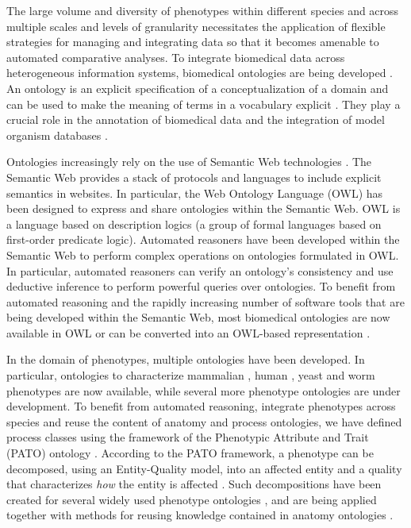\documentclass{bioinfo}
\renewcommand{\cite}{\citep}
\begin{document}
The large volume and diversity of phenotypes within different species
and across multiple scales and levels of granularity necessitates the
application of flexible strategies for managing and integrating data
so that it becomes amenable to automated comparative analyses. To
integrate biomedical data across heterogeneous information systems,
biomedical ontologies are being developed \cite{Smith2007}. An
ontology is an explicit specification of a conceptualization of a
domain and can be used to make the meaning of terms in a vocabulary
explicit \cite{Gruber1995, Guarino1998}. They play a crucial role in
the annotation of biomedical data and the integration of model
organism databases \cite{go2010, Bada2004, goble}.

Ontologies increasingly rely on the use of Semantic Web technologies
\cite{Berners-Lee2001}. The Semantic Web provides a stack of protocols
and languages to include explicit semantics in websites. In
particular, the Web Ontology Language (OWL) \cite{Grau2008} has been
designed to express and share ontologies within the Semantic Web. OWL
is a language based on description logics (a group of formal languages
based on first-order predicate logic). Automated reasoners have been
developed within the Semantic Web to perform complex operations on
ontologies formulated in OWL. In particular, automated reasoners can
verify an ontology's consistency and use deductive inference to
perform powerful queries over ontologies. To benefit from automated
reasoning and the rapidly increasing number of software tools that are
being developed within the Semantic Web, most biomedical ontologies
are now available in OWL or can be converted into an OWL-based
representation \cite{Horrocks2007, Hoehndorf2010patterns}.

In the domain of phenotypes, multiple ontologies have been
developed. In particular, ontologies to characterize mammalian
\cite{Smith2004}, human \cite{Robinson2008}, yeast \cite{ypo} and worm
\cite{wpo} phenotypes are now available, while several more phenotype
ontologies are under development. To benefit from automated reasoning,
integrate phenotypes across species and reuse the content of anatomy
and process ontologies, we have defined process classes using the
framework of the Phenotypic Attribute and Trait (PATO) ontology
\cite{Gkoutos2005}. According to the PATO framework, a phenotype can
be decomposed, using an Entity-Quality model, into an affected entity
and a quality that characterizes {\em how} the entity is affected
\cite{Gkoutos2005}. Such decompositions have been created for several
widely used phenotype ontologies \cite{Mungall2010, Gkoutos2009b,
  obml2011h1}, and are being applied together with methods for reusing
knowledge contained in anatomy ontologies \cite{Mungall2010,
  Hoehndorf2010phene}.
\end{document}
